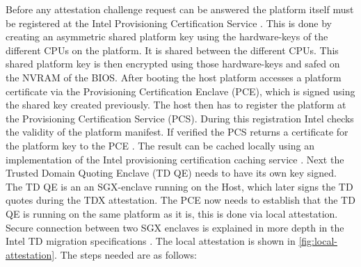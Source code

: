 \label{Pre-Attestation setup}
Before any attestation challenge request can be answered the platform itself must be registered at the Intel Provisioning Certification Service \cite{intel_corporation_dcap_2024-1}. This is done by creating an asymmetric shared platform key using the hardware-keys of the different CPUs on the platform. It is shared between the different CPUs. This shared platform key is then encrypted using those hardware-keys and safed on the NVRAM of the BIOS. After booting the host platform accesses a platform certificate via the Provisioning Certification Enclave (PCE), which is signed using the shared key created previously. The host then has to register the platform at the Provisioning Certification Service (PCS). During this registration Intel checks the validity of the platform manifest. If verified the PCS returns a certificate for the platform key to the PCE \cite{cheng_intel_2023}. The result can be cached locally using an implementation of the Intel provisioning certification caching service \cite{intel_corporation_design_2022}. Next the Trusted Domain Quoting Enclave (TD QE) needs to have its own key signed. The TD QE is an an \Gls{SGX}-enclave running on the Host, which later signs the TD quotes during the TDX attestation. The PCE now needs to establish that the TD QE is running on the same platform as it is, this is done via local attestation. Secure connection between two \Gls{SGX} enclaves is explained in more depth in the Intel TD migration specifications \cite{intel_corporation_migration_spec_2023}. The local attestation is shown in \cref{fig:local-attestation}. The steps needed are as follows:
\newcommand\setItemnumber[1]{\setcounter{enumi}{\numexpr#1-1\relax}}
